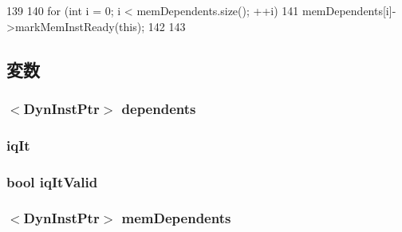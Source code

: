 \begin{DoxyCode}
139 {
140     for (int i = 0; i < memDependents.size(); ++i) {
141         memDependents[i]->markMemInstReady(this);
142     }
143 }
\end{DoxyCode}


\subsection{変数}
\hypertarget{classOzoneDynInst_a99b3ba0948715cdad5da539fcb59a9f6}{
\subsubsection[{dependents}]{$<${\bf DynInstPtr}$>$ {\bf dependents}}}
\label{classOzoneDynInst_a99b3ba0948715cdad5da539fcb59a9f6}
\hypertarget{classOzoneDynInst_a0deec4d5d0af5df075f848b721260166}{
\subsubsection[{iqIt}]{ {\bf iqIt}}}
\label{classOzoneDynInst_a0deec4d5d0af5df075f848b721260166}
\hypertarget{classOzoneDynInst_ad630ef8b639726d89d9efe060a618034}{
\subsubsection[{iqItValid}]{\setlength{\rightskip}{0pt plus 5cm}bool {\bf iqItValid}}}
\label{classOzoneDynInst_ad630ef8b639726d89d9efe060a618034}
\hypertarget{classOzoneDynInst_a5bb0000180ac8f071b922398c3ac227e}{
\subsubsection[{memDependents}]{$<${\bf DynInstPtr}$>$ {\bf memDependents}}}
